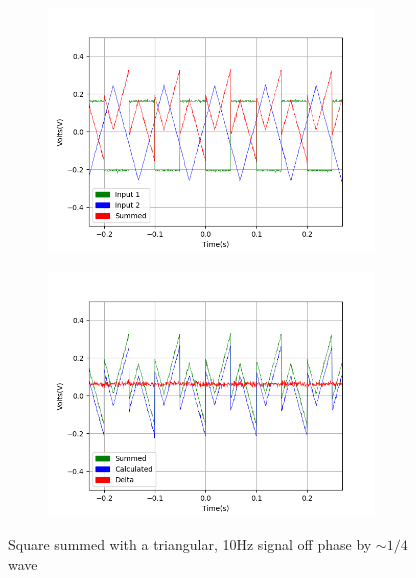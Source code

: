 \begin{figure}[h!]
\centering
\begin{subfigure}[t]{.475\textwidth}
  \centering
  \includegraphics[width=0.95\textwidth, height=0.20\textheight]{figures/Summing/scope_10raw.png}
 \label{fig:sum_10_og_data}
\end{subfigure}\hfill
\begin{subfigure}[t]{.475\textwidth}
  \centering
  \includegraphics[width=0.95\textwidth, height=0.20\textheight]{figures/Summing/scope_10.png}
\label{fig:sum_10_calc_data}
\end{subfigure}
\caption{Square summed with a triangular, 10Hz signal off phase by $\sim1/4$ wave}
\end{figure}


